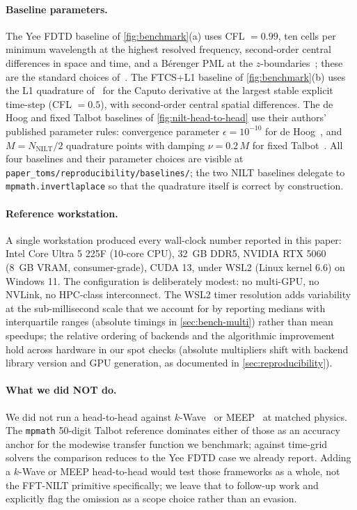 \documentclass[manuscript,review]{acmart}
\begin{document}
\paragraph{Baseline parameters.}
The Yee FDTD baseline of \cref{fig:benchmark}(a) uses CFL $= 0.99$,
ten cells per minimum wavelength at the highest resolved frequency,
second-order central differences in space and time, and a
B\'erenger PML at the $z$-boundaries~\cite{berenger1994}; these are
the standard choices of~\cite{taflove2005}. The FTCS+L1 baseline of
\cref{fig:benchmark}(b) uses the L1 quadrature
of~\cite{linxu2007,sunwu2006} for the Caputo derivative at the
largest stable explicit time-step (CFL $= 0.5$), with second-order
central spatial differences. The de Hoog and fixed Talbot baselines
of \cref{fig:nilt-head-to-head} use their authors' published
parameter rules: convergence parameter $\epsilon = 10^{-10}$ for
de Hoog~\cite{dehoog1982}, and $M = N_{\mathrm{NILT}}/2$ quadrature
points with damping $\nu = 0.2\,M$ for fixed
Talbot~\cite{talbot1979,abate2004}. All four baselines and their
parameter choices are visible at
\texttt{paper\_toms/reproducibility/baselines/}; the two NILT
baselines delegate to \texttt{mpmath.invertlaplace} so that the
quadrature itself is correct by construction.

\paragraph{Reference workstation.}
A single workstation produced every wall-clock number reported in
this paper: Intel Core Ultra 5 225F (10-core CPU), 32~GB DDR5,
NVIDIA RTX 5060 (8~GB VRAM, consumer-grade), CUDA 13, under WSL2
(Linux kernel 6.6) on Windows 11. The configuration is deliberately
modest: no multi-GPU, no NVLink, no HPC-class interconnect. The
WSL2 timer resolution adds variability at the sub-millisecond
scale that we account for by reporting medians with interquartile
ranges (absolute timings in \cref{sec:bench-multi}) rather than mean speedups; the
relative ordering of backends and the algorithmic improvement
hold across hardware in our spot checks (absolute multipliers
shift with backend library version and GPU generation, as
documented in \cref{sec:reproducibility}).

\paragraph{What we did NOT do.}
We did not run a head-to-head against
$k$-Wave~\cite{treeby2010} or MEEP~\cite{oskooi2010} at matched
physics. The \texttt{mpmath} 50-digit Talbot reference dominates
either of those as an accuracy anchor for the modewise transfer
function we benchmark; against time-grid solvers the comparison
reduces to the Yee FDTD case we already report. Adding a $k$-Wave
or MEEP head-to-head would test those frameworks as a whole, not
the FFT-NILT primitive specifically; we leave that to follow-up
work and explicitly flag the omission as a scope choice rather
than an evasion.
\end{document}
